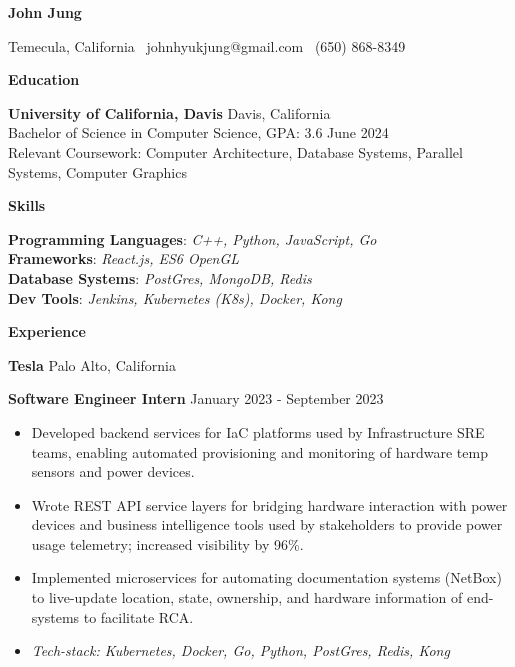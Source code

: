 \documentclass[11pt]{article}
\begin{document}
\begin{center}
    {\huge \textbf{John Jung}}\\ 
\end{center}

\begin{center}
    Temecula, California \textbullet \ johnhyukjung@gmail.com \textbullet \ (650) 868-8349 \\ 
    \hrulefill
\end{center}


\begin{center}
    \textbf{Education}
\end{center}
\textbf{University of California, Davis} \hfill Davis, California\\
Bachelor of Science in Computer Science, GPA: 3.6 \hfill June 2024\\
Relevant Coursework: Computer Architecture, Database Systems, Parallel Systems, Computer Graphics
\vspace{8pt}


\begin{center}
    \textbf{Skills}
\end{center}

\textbf{Programming Languages}: \textit{C++, Python, JavaScript, Go}\\
\textbf{Frameworks}: \textit{React.js, ES6 OpenGL}\\
\textbf{Database Systems}: \textit{PostGres, MongoDB, Redis}\\
\textbf{Dev Tools}: \textit{Jenkins, Kubernetes (K8s), Docker, Kong}

\begin{center}
    \textbf{Experience}
\end{center}
\textbf{Tesla} \hfill Palo Alto, California

\textbf{Software Engineer Intern} \hfill January 2023 - September 2023
\begin{itemize}[noitemsep, topsep=0pt, partopsep=0pt, parsep=0pt]
    \item Developed backend services for IaC platforms used by Infrastructure SRE teams, enabling automated provisioning and monitoring of hardware temp sensors and power devices.
    \item Wrote REST API service layers for bridging hardware interaction with power devices and business intelligence tools used by stakeholders to provide power usage telemetry; increased visibility by 96\%.
    \item Implemented microservices for automating documentation systems (NetBox) to live-update location, state, ownership, and hardware information of end-systems to facilitate RCA.
    \item \textit{Tech-stack: Kubernetes, Docker, Go, Python, PostGres, Redis, Kong}
\end{itemize}
\end{document}
